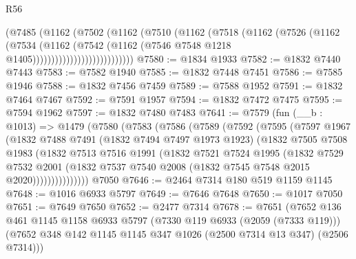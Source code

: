 \begin{lexlean}{R56}
\begin{coremodule}
                            (@7485
                              (@1162
                                (@7502
                                  (@1162
                                    (@7510
                                      (@1162
                                        (@7518
                                          (@1162
                                            (@7526
                                              (@1162
                                                (@7534
                                                  (@1162
                                                    (@7542
                                                      (@1162
                                                        (@7546
                                                          @7548
                                                          @1218
                                                          @1405)))))))))))))))))))))))))))
@7580 := @1834 @1933
@7582 := @1832 @7440 @7443
@7583 := @7582 @1940
@7585 := @1832 @7448 @7451
@7586 := @7585 @1946
@7588 := @1832 @7456 @7459
@7589 := @7588 @1952
@7591 := @1832 @7464 @7467
@7592 := @7591 @1957
@7594 := @1832 @7472 @7475
@7595 := @7594 @1962
@7597 := @1832 @7480 @7483
@7641 := @7579
    (fun (__b : @1013) =>
    @1479
      (@7580
        (@7583
          (@7586
            (@7589
              (@7592
                (@7595
                  (@7597
                    @1967
                    (@1832
                      @7488
                      @7491
                      (@1832 @7494 @7497 @1973 @1923)
                      (@1832
                        @7505
                        @7508
                        @1983
                        (@1832
                          @7513
                          @7516
                          @1991
                          (@1832
                            @7521
                            @7524
                            @1995
                            (@1832
                              @7529
                              @7532
                              @2001
                              (@1832 @7537 @7540 @2008 (@1832 @7545 @7548 @2015 @2020)))))))))))))))
    @7050
@7646 := @2464 @7314 @180 @519 @1159 @1145
@7648 := @1016 @6933 @5797
@7649 := @7646 @7648
@7650 := @1017 @7050
@7651 := @7649 @7650
@7652 := @2477 @7314
@7678 := @7651
    (@7652
      @136
      @461
      @1145
      @1158
      @6933
      @5797
      (@7330 @119 @6933 (@2059 (@7333 @119)))
      (@7652 @348 @142 @1145 @1145 @347 @1026 (@2500 @7314 @13 @347) (@2506 @7314)))

\end{coremodule}
\end{lexlean}
